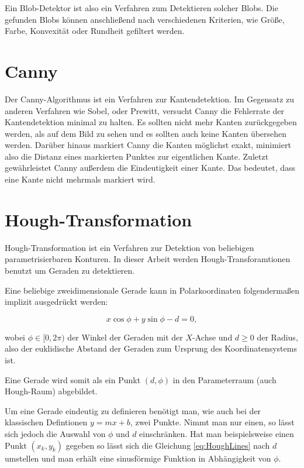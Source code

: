 Ein Blob-Detektor ist also ein Verfahren zum Detektieren solcher Blobs. Die gefunden Blobs können anschließend nach verschiedenen Kriterien, wie Größe, Farbe, Konvexität oder Rundheit gefiltert werden. 

\section{Canny}
\label{s:canny}
Der Canny-Algorithmus\cite{Canny1986} ist ein Verfahren zur Kantendetektion. Im Gegensatz zu anderen Verfahren wie Sobel, oder Prewitt, versucht Canny die Fehlerrate der Kantendetektion minimal zu halten. 
Es sollten nicht mehr Kanten zurückgegeben werden, als auf dem Bild zu sehen und es sollten auch keine Kanten übersehen werden. Darüber hinaus markiert Canny die Kanten möglichst exakt, minimiert also die Distanz eines markierten Punktes zur eigentlichen Kante. Zuletzt gewährleistet Canny außerdem die Eindeutigkeit einer Kante. Das bedeutet, dass eine Kante nicht mehrmals markiert wird.

\section{Hough-Transformation}
\label{s:hough}
Hough-Transformation ist ein Verfahren zur Detektion von beliebigen parametrisierbaren Konturen. In dieser Arbeit werden Hough-Transforamtionen benutzt um Geraden zu detektieren. 

Eine beliebige zweidimensionale Gerade kann in Polarkoordinaten folgendermaßen implizit ausgedrückt werden:

\begin{equation}\label{eq:HoughLines}
x\cos\phi + y\sin\phi - d = 0,
\end{equation}

wobei $\phi \in [0,2\pi)$ der Winkel der Geraden mit der $X$-Achse und $d \geq 0$ der Radius, also der euklidische Abstand der Geraden zum Ursprung des Koordinatensystems ist.

Eine Gerade wird somit als ein Punkt $(d,\phi)$ in den Parameterraum (auch Hough-Raum) abgebildet. 

Um eine Gerade eindeutig zu definieren benötigt man, wie auch bei der klassischen Defintionen $y = mx + b$, zwei Punkte. Nimmt man nur einen, so lässt sich jedoch die Auswahl von $\phi$ und $d$ einschränken. Hat man beispielsweise einen Punkt $(x_k,y_k)$ gegeben so lässt sich die Gleichung \ref{eq:HoughLines} nach $d$ umstellen und man erhält eine sinusförmige Funktion in Abhängigkeit von $\phi$. 

